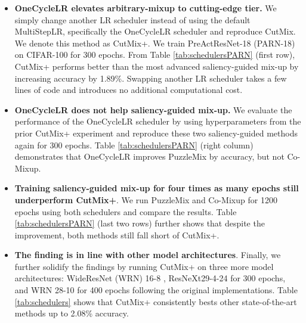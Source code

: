 \documentclass[letterpaper]{article} \usepackage[submission]{aaai23}  \usepackage{times}  \usepackage{helvet}  \usepackage{courier}  \usepackage[hyphens]{url}  \usepackage{graphicx} \urlstyle{rm} \def\UrlFont{\rm}  \usepackage{natbib}  \usepackage{caption} \frenchspacing  \setlength{\pdfpagewidth}{8.5in} \setlength{\pdfpageheight}{11in}
\newcommand{\cutmix}{{CutMix}}
\newcommand{\puzzlemix}{{PuzzleMix}}
\newcommand{\comixup}{{Co-Mixup}}
\newcommand{\cifar}{CIFAR-100}
\begin{document}
\begin{itemize}
    \item \textbf{OneCycleLR elevates arbitrary-mixup to cutting-edge tier.} We simply change another LR scheduler instead of using the default MultiStepLR, specifically the OneCycleLR scheduler \cite{smith2018superconvergence} and reproduce \cutmix{}. We denote this method as \cutmix{}+. We train PreActResNet-18 (PARN-18) \cite{he2016preact} on \cifar{} for 300 epochs. From Table \ref{tab:schedulersPARN} (first row), \cutmix{}+ performs better than the most advanced saliency-guided mix-up by increasing accuracy by 1.89\%.
    Swapping another LR scheduler takes a few lines of code and introduces no additional computational cost.
    
    
    \item \textbf{OneCycleLR does not help saliency-guided mix-up.} We evaluate the performance of the OneCycleLR scheduler by using hyperparameters from the prior \cutmix{}+ experiment and reproduce these two saliency-guided methods again for 300 epochs. Table \ref{tab:schedulersPARN} (right column) demonstrates that OneCycleLR improves \puzzlemix{} by  accuracy, but not \comixup{}.

    
    \item \textbf{Training saliency-guided mix-up for four times as many epochs still underperform \cutmix{}+}. We run \puzzlemix{} and \comixup{} for 1200 epochs using both schedulers and compare the results. Table \ref{tab:schedulersPARN} (last two rows) further shows that despite the improvement, both methods still fall short of \cutmix{}+. 
    
    \item \textbf{The finding is in line with other model architectures}. Finally, we further solidify the findings by running \cutmix{}+ on three more model architectures: WideResNet (WRN) 16-8 \cite{zagoruyko2017widern}, ResNeXt29-4-24 \cite{xie2016resnext} for 300 epochs, and WRN 28-10 for 400 epochs following the original implementations. Table \ref{tab:schedulers} shows that \cutmix{}+ consistently bests other state-of-the-art methods up to 2.08\% accuracy.
\end{itemize}
\end{document}
